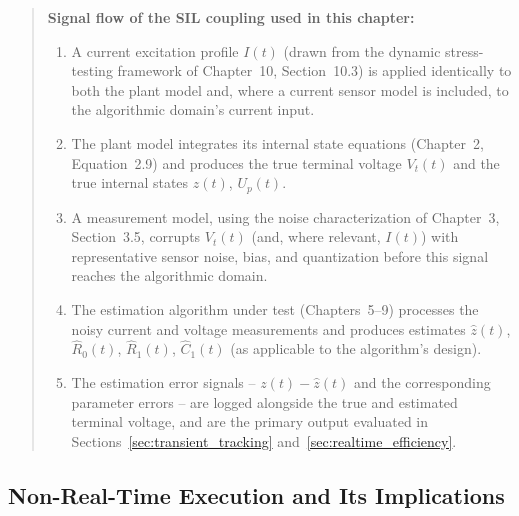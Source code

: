 \begin{quote}
\textbf{Signal flow of the SIL coupling used in this chapter:}
\begin{enumerate}
	\item A current excitation profile $I(t)$ (drawn from the dynamic stress-testing framework of Chapter~10, Section~10.3) is applied identically to both the plant model and, where a current sensor model is included, to the algorithmic domain's current input.
	\item The plant model integrates its internal state equations (Chapter~2, Equation~2.9) and produces the true terminal voltage $V_t(t)$ and the true internal states $z(t)$, $U_p(t)$.
	\item A measurement model, using the noise characterization of Chapter~3, Section~3.5, corrupts $V_t(t)$ (and, where relevant, $I(t)$) with representative sensor noise, bias, and quantization before this signal reaches the algorithmic domain.
	\item The estimation algorithm under test (Chapters~5--9) processes the noisy current and voltage measurements and produces estimates $\hat{z}(t)$, $\hat{R}_0(t)$, $\hat{R}_1(t)$, $\hat{C}_1(t)$ (as applicable to the algorithm's design).
	\item The estimation error signals -- $z(t) - \hat{z}(t)$ and the corresponding parameter errors -- are logged alongside the true and estimated terminal voltage, and are the primary output evaluated in Sections~\ref{sec:transient_tracking} and~\ref{sec:realtime_efficiency}.
\end{enumerate}
\end{quote}

\subsection{Non-Real-Time Execution and Its Implications}
\label{ssec:sil_nonrealtime}

